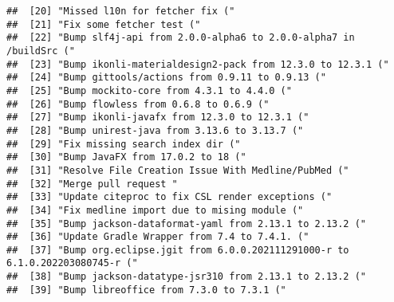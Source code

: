 \documentclass[
]{article}
\begin{document}
\begin{verbatim}
##  [20] "Missed l10n for fetcher fix ("                                                                                              
##  [21] "Fix some fetcher test ("                                                                                                    
##  [22] "Bump slf4j-api from 2.0.0-alpha6 to 2.0.0-alpha7 in /buildSrc ("                                                            
##  [23] "Bump ikonli-materialdesign2-pack from 12.3.0 to 12.3.1 ("                                                                   
##  [24] "Bump gittools/actions from 0.9.11 to 0.9.13 ("                                                                              
##  [25] "Bump mockito-core from 4.3.1 to 4.4.0 ("                                                                                    
##  [26] "Bump flowless from 0.6.8 to 0.6.9 ("                                                                                        
##  [27] "Bump ikonli-javafx from 12.3.0 to 12.3.1 ("                                                                                 
##  [28] "Bump unirest-java from 3.13.6 to 3.13.7 ("                                                                                  
##  [29] "Fix missing search index dir ("                                                                                             
##  [30] "Bump JavaFX from 17.0.2 to 18 ("                                                                                            
##  [31] "Resolve File Creation Issue With Medline/PubMed ("                                                                          
##  [32] "Merge pull request "                                                                                                        
##  [33] "Update citeproc to fix CSL render exceptions ("                                                                             
##  [34] "Fix medline import due to mising module ("                                                                                  
##  [35] "Bump jackson-dataformat-yaml from 2.13.1 to 2.13.2 ("                                                                       
##  [36] "Update Gradle Wrapper from 7.4 to 7.4.1. ("                                                                                 
##  [37] "Bump org.eclipse.jgit from 6.0.0.202111291000-r to 6.1.0.202203080745-r ("                                                  
##  [38] "Bump jackson-datatype-jsr310 from 2.13.1 to 2.13.2 ("                                                                       
##  [39] "Bump libreoffice from 7.3.0 to 7.3.1 ("                                                                                     

\end{verbatim}
\end{document}
